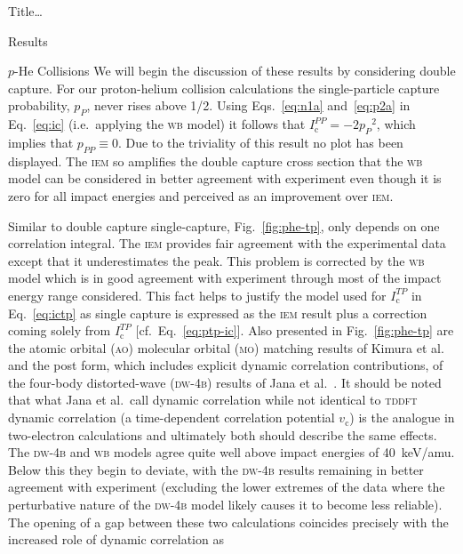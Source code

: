 \documentclass[letterpaper, 10 pt]{report}
\begin{document}
\begin{chapter}{ Title\dots \label{chap:p-he2p-he}}
\begin{section}{Results \label{sec:phe2p-res}}
\begin{subsection}{\texorpdfstring{$p$}{p}-He Collisions \label{sec:phe-res}}
         We will begin the discussion of these results by considering double capture. For our
         proton-helium collision calculations the single-particle capture probability, $p_P$, never
         rises above 1/2. Using Eqs.~\eqref{eq:n1a} and~\eqref{eq:p2a} in Eq.~\eqref{eq:ic} (i.e.\
         applying the \textsc{wb} model) it follows that $I^{PP}_\mathrm{c} = -2 {p_P}^2$, which implies
         that $p_{PP} \equiv 0$. Due to the triviality of this result no plot has been displayed. The
         \textsc{iem} so amplifies the double capture cross section that the \textsc{wb} model can be
         considered in better agreement with experiment even though it is zero for all impact energies
         and perceived as an improvement over \textsc{iem}.

         Similar to double capture single-capture, Fig.~\ref{fig:phe-tp}, only depends on one
         correlation integral. The \textsc{iem} provides fair agreement with the experimental data
         except that it underestimates the peak. This problem is corrected by the \textsc{wb} model
         which is in good agreement with experiment through most of the impact energy range considered.
         This fact helps to justify the model used for $I^{TP}_\mathrm{c}$ in Eq.~\eqref{eq:ictp} as
         single capture is expressed as the \textsc{iem} result plus a correction coming solely from
         $I^{TP}_\mathrm{c}$ [cf.\ Eq.~\eqref{eq:ptp-ic}]. Also presented in Fig.~\ref{fig:phe-tp} are
         the atomic orbital (\textsc{ao}) molecular orbital (\textsc{mo}) matching results of Kimura et
         al.~\cite{KL-86} and the post form, which includes explicit dynamic correlation contributions,
         of the four-body distorted-wave (\textsc{dw-4b}) results of Jana et al.~\cite{JMP-15}. It
         should be noted that what Jana et al.\ call dynamic correlation while not identical to
         \textsc{tddft} dynamic correlation (a time-dependent correlation potential $v_\mathrm{c}$) is
         the analogue in two-electron calculations and ultimately both should describe the same effects.
         The \textsc{dw-4b} and \textsc{wb} models agree quite well above impact energies of 40~keV/amu.
         Below this they begin to deviate, with the \textsc{dw-4b} results remaining in better agreement
         with experiment (excluding the lower extremes of the data where the perturbative nature of the
         \textsc{dw-4b} model likely causes it to become less reliable). The opening of a gap between
         these two calculations coincides precisely with the increased role of dynamic correlation as

\end{subsection}
\end{section}
\end{chapter}
\end{document}
